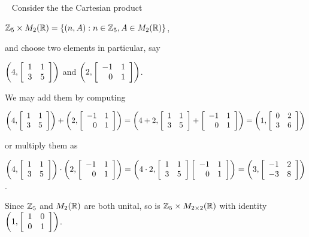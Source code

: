 \documentclass[11pt,fleqn,dvipsnames,usenames]{article}
\newcommand{\p}{\noindent}
\begin{document}
\begin{example}~
Consider the the Cartesian product
\begin{center}
$\Z_{5}\times M_{2}(\REAL) =\SET{(n,A):n\in\Z_5, A\in M_{2}(\REAL)}$,
\end{center}
and choose two elements in particular, say
\begin{center}
$\left(4, \MATRIX{rr}{1 & 1\\3 & 5}\right)$ and $\left(2, \MATRIX{rr}{-1  & 1\\0 & 1}\right)$.
\end{center}
We may add them by computing
\begin{center}
$\left(4, \MATRIX{rr}{1 & 1\\3 & 5}\right) + \left(2, \MATRIX{rr}{-1  & 1\\0 & 1}\right) = \left(4 + 2, \MATRIX{rr}{1 & 1\\3 & 5} + \MATRIX{rr}{-1  & 1\\0 & 1}\right) = \left(1, \MATRIX{rr}{0 & 2\\3 & 6}\right)$
\end{center}
or multiply them as
\begin{center}
$\left(4, \MATRIX{rr}{1 & 1\\3 & 5}\right)\cdot \left(2, \MATRIX{rr}{-1  & 1\\0 & 1}\right) = \left(4\cdot 2, \MATRIX{rr}{1 & 1\\3 & 5}\MATRIX{rr}{-1  & 1\\0 & 1}\right) = \left(3, \MATRIX{rr}{-1 & 2\\-3 & 8}\right)$.
\end{center}
\p Since $\Z_{5}$ and $M_{2}(\REAL)$ are both unital, so is $\Z_{5}\times M_{2\BY 2}(\REAL)$ with identity $\left(1,\MATRIX{rr}{1 & 0\\0 & 1}\right)$.
\end{example}
%
\end{document}
